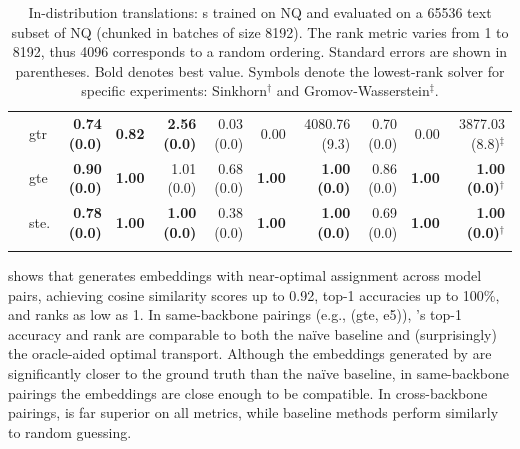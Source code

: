\begin{table}[!b]
\begin{tabular}{llrrrrrrrrr}
        & gtr & \textbf{0.74 {\tiny (0.0)}} & \textbf{0.82} & \textbf{2.56 {\tiny (0.0)}} & 0.03 {\tiny (0.0)} & 0.00 & 4080.76 {\tiny (9.3)} & 0.70 {\tiny (0.0)} & 0.00 & 3877.03 {\tiny (8.8)}$^{\ddagger}$ \\
        & gte & \textbf{0.90 {\tiny (0.0)}} & \textbf{1.00} & 1.01 {\tiny (0.0)} & 0.68 {\tiny (0.0)} & \textbf{1.00} & \textbf{1.00 {\tiny (0.0)}} & 0.86 {\tiny (0.0)} & \textbf{1.00} & \textbf{1.00 {\tiny (0.0)}$^{\dagger}$} \\
        & ste. & \textbf{0.78 {\tiny (0.0)}} & \textbf{1.00} & \textbf{1.00 {\tiny (0.0)}} & 0.38 {\tiny (0.0)} & \textbf{1.00} & \textbf{1.00 {\tiny (0.0)}} & 0.69 {\tiny (0.0)} & \textbf{1.00} & \textbf{1.00 {\tiny (0.0)}$^{\dagger}$} \\
        \bottomrule\\[-1.6ex]
    \end{tabular}
    \caption{In-distribution translations: \atk{}s trained on NQ and evaluated on a 65536 text subset of NQ (chunked in batches of size 8192). The rank metric varies from 1 to 8192, thus 4096 corresponds to a random ordering. Standard errors are shown in parentheses. Bold denotes best value. Symbols denote the lowest-rank solver for specific experiments: Sinkhorn$^\dagger$ and Gromov-Wasserstein$^\ddagger$.}
    \label{tab:embedding_comparison}
\end{table}

 shows that \atk{} generates embeddings with near-optimal assignment across model pairs, achieving cosine similarity scores up to 0.92, top-1 accuracies up to 100\%, and ranks as low as 1. In same-backbone pairings (e.g., (gte, e5)), \atk{}'s top-1 accuracy and rank are comparable to both the naïve baseline and (surprisingly) the oracle-aided optimal transport. Although the embeddings generated by \atk{} are significantly closer to the ground truth than the naïve baseline, in same-backbone pairings the embeddings are close enough to be compatible.  In cross-backbone pairings, \atk{} is far superior on all metrics, while baseline methods perform similarly to random guessing.


